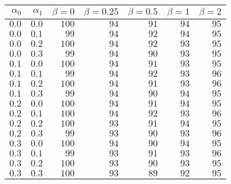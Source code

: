 \begin{tabular}{rr|rrrrr}
\hline\hline
 $\alpha_0$ & $\alpha_1$ & $\beta=0$ & $\beta=0.25$ & $\beta=0.5$ & $\beta=1$ & $\beta=2$ \\ 
 \hline
$0.0$ & $0.0$ & $100$ & $94$ & $91$ & $94$ & $95$\\ 
$0.0$ & $0.1$ & $ 99$ & $94$ & $92$ & $94$ & $95$\\ 
$0.0$ & $0.2$ & $100$ & $94$ & $92$ & $93$ & $95$\\ 
$0.0$ & $0.3$ & $ 99$ & $94$ & $90$ & $93$ & $95$\\ 
$0.1$ & $0.0$ & $100$ & $94$ & $91$ & $93$ & $95$\\ 
$0.1$ & $0.1$ & $ 99$ & $94$ & $92$ & $93$ & $96$\\ 
$0.1$ & $0.2$ & $100$ & $94$ & $91$ & $93$ & $96$\\ 
$0.1$ & $0.3$ & $ 99$ & $94$ & $90$ & $94$ & $95$\\ 
$0.2$ & $0.0$ & $100$ & $94$ & $91$ & $94$ & $95$\\ 
$0.2$ & $0.1$ & $100$ & $94$ & $92$ & $93$ & $96$\\ 
$0.2$ & $0.2$ & $100$ & $93$ & $91$ & $94$ & $95$\\ 
$0.2$ & $0.3$ & $ 99$ & $93$ & $90$ & $93$ & $96$\\ 
$0.3$ & $0.0$ & $100$ & $94$ & $90$ & $94$ & $95$\\ 
$0.3$ & $0.1$ & $ 99$ & $93$ & $91$ & $93$ & $96$\\ 
$0.3$ & $0.2$ & $100$ & $93$ & $90$ & $93$ & $95$\\ 
$0.3$ & $0.3$ & $100$ & $93$ & $89$ & $92$ & $95$\\ 
 \hline 
 \end{tabular}